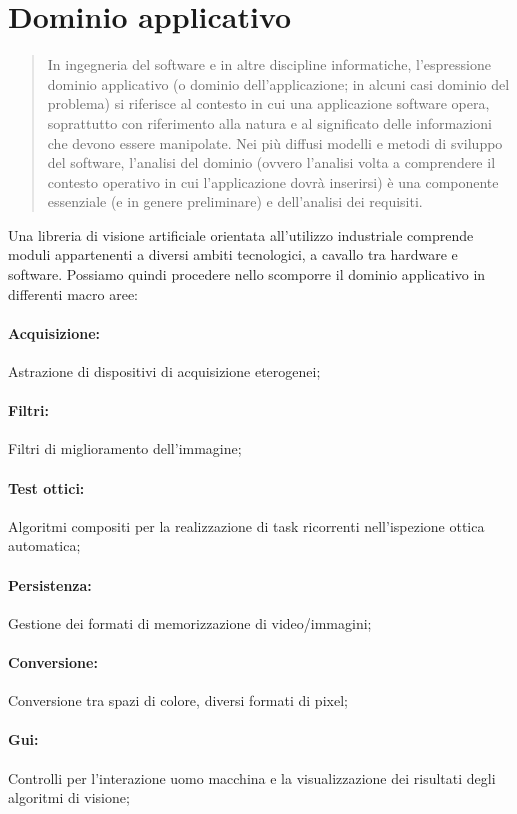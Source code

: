 \section{Dominio applicativo}
\label{sec:dominio-applicativo}

\begin{quote}
\small
In ingegneria del software e in altre discipline informatiche, l'espressione dominio applicativo (o dominio dell'applicazione; in alcuni casi dominio del problema) si riferisce al contesto in cui una applicazione software opera, soprattutto con riferimento alla natura e al significato delle informazioni che devono essere manipolate. Nei più diffusi modelli e metodi di sviluppo del software, l'analisi del dominio (ovvero l'analisi volta a comprendere il contesto operativo in cui l'applicazione dovrà inserirsi) è una componente essenziale (e in genere preliminare) e dell'analisi dei requisiti.\cite{requisiti}
\end{quote}
Una libreria di visione artificiale orientata all'utilizzo industriale comprende moduli appartenenti a diversi ambiti tecnologici, a cavallo tra hardware e software. Possiamo quindi procedere nello scomporre il dominio applicativo in differenti macro aree:

\paragraph{Acquisizione:}
Astrazione di dispositivi di acquisizione eterogenei;
\paragraph{Filtri:}
Filtri di miglioramento dell'immagine;
\paragraph{Test ottici:}
Algoritmi compositi per la realizzazione di task ricorrenti nell'ispezione ottica automatica;
\paragraph{Persistenza:}
Gestione dei formati di memorizzazione di video/immagini;
\paragraph{Conversione:}
Conversione tra spazi di colore, diversi formati di pixel;
\paragraph{Gui:}
Controlli per l'interazione uomo macchina e la visualizzazione dei risultati degli algoritmi di visione;



